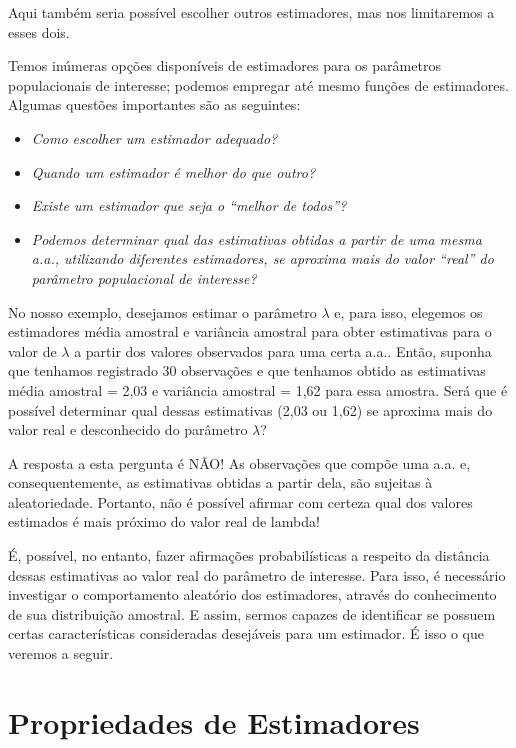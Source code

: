 \documentclass[
]{book}
\providecommand{\tightlist}{%
  \setlength{\itemsep}{0pt}\setlength{\parskip}{0pt}}
\theoremstyle{definition}
\theoremstyle{definition}
\theoremstyle{definition}
\theoremstyle{remark}
\begin{document}
Aqui também seria possível escolher outros estimadores, mas nos limitaremos a esses dois.

Temos inúmeras opções disponíveis de estimadores para os parâmetros populacionais de interesse; podemos empregar até mesmo funções de estimadores. Algumas questões importantes são as seguintes:

\begin{itemize}
\tightlist
\item
  \emph{Como escolher um estimador adequado?}\\
\item
  \emph{Quando um estimador é melhor do que outro?}\\
\item
  \emph{Existe um estimador que seja o ``melhor de todos''?}\\
\item
  \emph{Podemos determinar qual das estimativas obtidas a partir de uma mesma a.a., utilizando diferentes estimadores, se aproxima mais do valor ``real'' do parâmetro populacional de interesse?}
\end{itemize}

No nosso exemplo, desejamos estimar o parâmetro \(\lambda\) e, para isso, elegemos os estimadores média amostral e variância amostral para obter estimativas para o valor de \(\lambda\) a partir dos valores observados para uma certa a.a.. Então, suponha que tenhamos registrado 30 observações e que tenhamos obtido as estimativas média amostral = 2,03 e variância amostral = 1,62 para essa amostra. Será que é possível determinar qual dessas estimativas (2,03 ou 1,62) se aproxima mais do valor real e desconhecido do parâmetro \(\lambda\)?

A resposta a esta pergunta é NÃO! As observações que compõe uma a.a. e, consequentemente, as estimativas obtidas a partir dela, são sujeitas à aleatoriedade. Portanto, não é possível afirmar com certeza qual dos valores estimados é mais próximo do valor real de lambda!

É, possível, no entanto, fazer afirmações probabilísticas a respeito da distância dessas estimativas ao valor real do parâmetro de interesse. Para isso, é necessário investigar o comportamento aleatório dos estimadores, através do conhecimento de sua distribuição amostral. E assim, sermos capazes de identificar se possuem certas características consideradas desejáveis para um estimador. É isso o que veremos a seguir.

\hypertarget{propriedades-de-estimadores}{%
\section{Propriedades de Estimadores}\label{propriedades-de-estimadores}}
\end{document}
